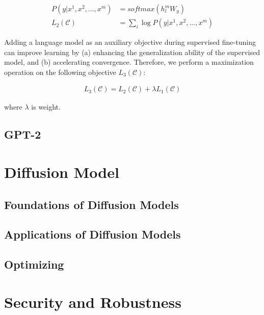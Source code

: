 \documentclass{IEEEtran}
\begin{document}
\begin{align*}
    P(y | x^1, x^2, ..., x^m) &= softmax(h_l^m W_y) \\
    L_2(\mathcal{C}) &= \sum_{i}\log P(y | x^1, x^2, ..., x^m)
\end{align*}

Adding a language model as an auxiliary objective during supervised fine-tuning 
can improve learning by (a) enhancing the generalization ability of the supervised 
model, and (b) accelerating convergence. Therefore, we perform a maximization operation 
on the following objective $L_3(\mathcal{C})$:

\begin{align*}
    L_3(\mathcal{C}) = L_2(\mathcal{C}) + \lambda L_1(\mathcal{C})
\end{align*}

\par where $\lambda$ is weight.

\subsection{GPT-2}









\section{Diffusion Model}
\subsection{Foundations of Diffusion Models}
\subsection{Applications of Diffusion Models}
\subsection{Optimizing}

\section{Security and Robustness}
\end{document}
